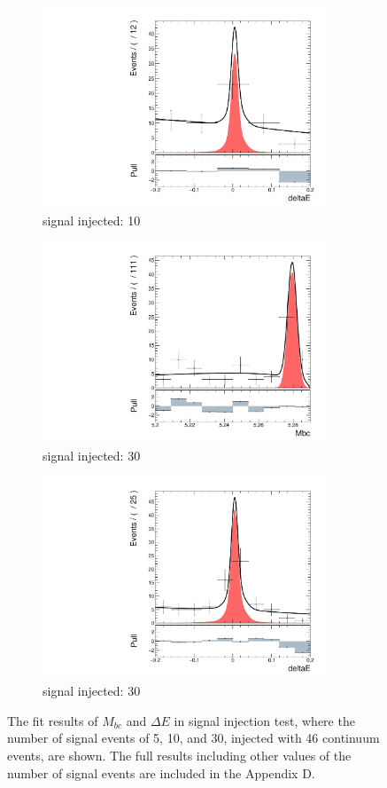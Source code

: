\begin{figure}[htpb]
\begin{subfigure}{0.5\linewidth}
		\includegraphics[page=1,height=6cm]{figures/injection_sig_10/ds_gen_deltaE_2D.pdf}
		\caption{signal injected: 10}
	\end{subfigure}
		\begin{subfigure}{0.5\linewidth}
		\includegraphics[page=1,height=6cm]{figures/injection_sig_30/ds_gen_Mbc_2D.pdf}
		\caption{signal injected: 30}
	\end{subfigure}
	\begin{subfigure}{0.5\linewidth}
		\includegraphics[page=1,height=6cm]{figures/injection_sig_30/ds_gen_deltaE_2D.pdf}
		\caption{signal injected: 30}
	\end{subfigure}
	\caption{The fit results of $M_{bc}$ and $\Delta E$ in signal injection test, where the number of signal events of 5, 10, and 30, injected with 46 continuum events, are shown. The full results including other values of the number of signal events are included in the Appendix D. }
	\label{fig:2Dinject}
\end{figure}


